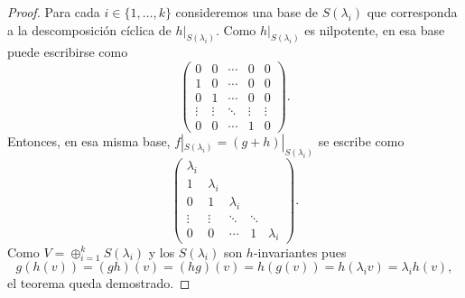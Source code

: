 \begin{thm}
\begin{proof}
        Para cada $i\in\{1,\dots,k\}$ consideremos una base de $S(\lambda_i)$
        que corresponda a la descomposición cíclica de $h|_{S(\lambda_i)}$.
        Como $h|_{S(\lambda_i)}$ es nilpotente, en esa base puede escribirse
        como
        \[
       	\begin{pmatrix}
			0 & 0 & \cdots & 0 & 0\\
			1 & 0 & \cdots & 0 & 0\\
			0 & 1 & \cdots & 0 & 0\\
			\vdots & \vdots & \ddots & \vdots & \vdots\\
			0 & 0 & \cdots & 1 & 0
		\end{pmatrix}.
        \]
        Entonces, en esa misma base, $f|_{S(\lambda_i)}=(g+h)|_{S(\lambda_i)}$
        se escribe como
        \[
        \begin{pmatrix}
            \lambda_i\\
            1 & \lambda_i\\
            0 & 1 & \lambda_i\\
            \vdots & \vdots & \ddots & \ddots\\
            0&0&\cdots&1&\lambda_i
        \end{pmatrix}.
        \]
        Como $V=\oplus_{i=1}^kS(\lambda_i)$ y los $S(\lambda_i)$ son
        $h$-invariantes pues
        \[
            g(h(v))=(gh)(v)=(hg)(v)=h(g(v))=h(\lambda_iv)=\lambda_ih(v),
        \]
        el teorema queda demostrado.
    \end{proof}
\end{thm}


